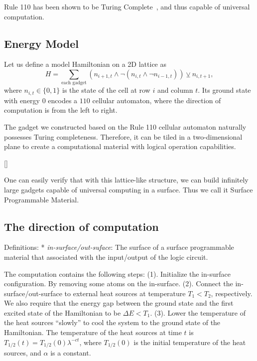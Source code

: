 \documentclass[twocolumn,superscriptaddress,english,showpacs,longbibliography]{revtex4-2}
\newcommand{\jgl}[1]{[{\color{green}{JGL: #1}}]}
\begin{document}
Rule 110 has been shown to be Turing Complete~\cite{Cook2009}, and thus capable of universal
computation.

\subsection{Energy Model}\label{a-2d-surface-programmable-material}

Let us define a model Hamiltonian on a 2D lattice as
\begin{equation}
H = \sum_{\text{each gadget}} (n_{i+1, t} \land \neg(n_{i, t} \land \neg n_{i-1, t})) \veebar n_{i,t+1},
\end{equation}
where $n_{i, t} \in \{0, 1\}$ is the state of the cell at row $i$ and column $t$.
Its ground state with energy $0$ encodes a $110$ cellular automaton, where the direction of computation is from the left to right.

The gadget we constructed based on the Rule 110 cellular automaton
naturally possesses Turing completeness. Therefore, it can be tiled in a
two-dimensional plane to create a computational material with logical
operation capabilities.

\jgl{We need a main figure to show the tiling and cooling.}

One can easily verify that with this lattice-like structure, we can
build infinitely large gadgets capable of universal computing in a
surface. Thus we call it Surface Programmable Material.

\subsection{The direction of computation}\label{deterministic-and-non-deterministic-computation}

Definitions: * \emph{in-surface/out-suface}: The surface of a surface
programmable material that associated with the input/output of the logic
circuit.

The computation contains the following steps: (1). Initialize the in-surface configuration. By removing
some atoms on the in-surface. (2). Connect the in-surface/out-surface to
external heat sources at temperature $T_1 < T_2$, respectively. We
also require that the energy gap between the ground state and the first
excited state of the Hamiltonian to be $\Delta E< T_1$. (3). Lower the
temperature of the heat sources ``slowly'' to cool the system to the
ground state of the Hamiltonian. The temperature of the heat sources at
time $t$ is $T_{1/2}(t) = T_{1/2}(0)\lambda^{-c t}$, where
$T_{1/2}(0)$ is the initial temperature of the heat sources, and
$\alpha$ is a constant.
\end{document}
